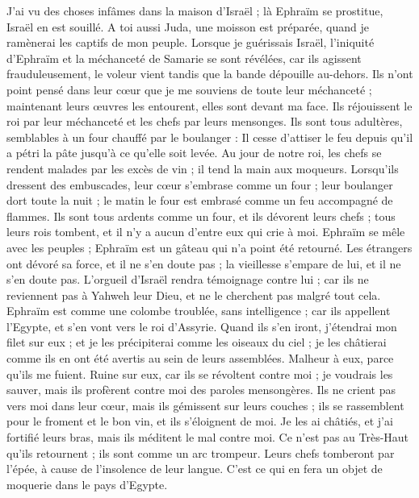 \begin{multicols}{2}
J'ai vu des choses infâmes dans la maison d'Israël ; là Ephraïm se prostitue, Israël en est souillé.
A toi aussi Juda, une moisson est préparée, quand je ramènerai les captifs de mon peuple.
\VerseOne{}Lorsque je guérissais Israël, l'iniquité d'Ephraïm et la méchanceté de Samarie se sont révélées, car ils agissent frauduleusement, le voleur vient tandis que la bande dépouille au-dehors.
Ils n'ont point pensé dans leur cœur que je me souviens de toute leur méchanceté ; maintenant leurs œuvres les entourent, elles sont devant ma face.
Ils réjouissent le roi par leur méchanceté et les chefs par leurs mensonges.
Ils sont tous adultères, semblables à un four chauffé par le boulanger : Il cesse d’attiser le feu depuis qu’il a pétri la pâte jusqu'à ce qu'elle soit levée.
Au jour de notre roi, les chefs se rendent malades par les excès de vin ; il tend la main aux moqueurs.
Lorsqu’ils dressent des embuscades, leur cœur s’embrase comme un four ; leur boulanger dort toute la nuit ; le matin le four est embrasé comme un feu accompagné de flammes.
Ils sont tous ardents comme un four, et ils dévorent leurs chefs ; tous leurs rois tombent, et il n'y a aucun d'entre eux qui crie à moi.
Ephraïm se mêle avec les peuples ; Ephraïm est un gâteau qui n'a point été retourné.
Les étrangers ont dévoré sa force, et il ne s’en doute pas ; la vieillesse s’empare de lui, et il ne s’en doute pas.
L'orgueil d'Israël rendra témoignage contre lui ; car ils ne reviennent pas à Yahweh leur Dieu, et ne le cherchent pas malgré tout cela.
Ephraïm est comme une colombe troublée, sans intelligence ; car ils appellent l'Egypte, et s’en vont vers le roi d'Assyrie.
Quand ils s’en iront, j'étendrai mon filet sur eux ; et je les précipiterai comme les oiseaux du ciel ; je les châtierai comme ils en ont été avertis au sein de leurs assemblées.
Malheur à eux, parce qu'ils me fuient. Ruine sur eux, car ils se révoltent contre moi ; je voudrais les sauver, mais ils profèrent contre moi des paroles mensongères.
Ils ne crient pas vers moi dans leur cœur, mais ils gémissent sur leurs couches ; ils se rassemblent pour le froment et le bon vin, et ils s’éloignent de moi.
Je les ai châtiés, et j'ai fortifié leurs bras, mais ils méditent le mal contre moi.
Ce n’est pas au Très-Haut qu’ils retournent ; ils sont comme un arc trompeur. Leurs chefs tomberont par l’épée, à cause de l’insolence de leur langue. C’est ce qui en fera un objet de moquerie dans le pays d'Egypte.

\end{multicols}
